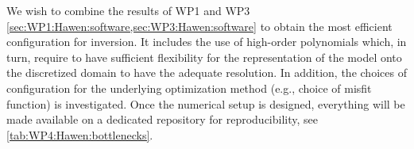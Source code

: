 We wish to combine the results of WP1 and WP3 
\cref{sec:WP1:Hawen:software,sec:WP3:Hawen:software} 
to obtain the most efficient configuration for inversion.
It includes the use of high-order polynomials which, in turn,
require to have sufficient flexibility for the representation 
of the model onto the discretized domain to have the adequate
resolution. In addition, the choices of configuration for the 
underlying optimization method (e.g., choice of misfit function)
is investigated.
Once the numerical setup is designed, everything will be 
made available on a dedicated repository for reproducibility,
see \cref{tab:WP4:Hawen:bottlenecks}.


